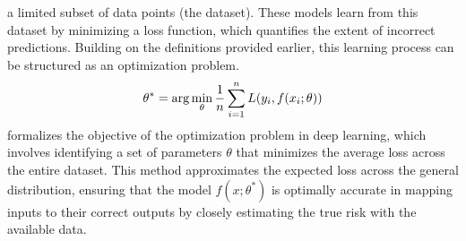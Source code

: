 a limited subset of data points (the dataset). These models learn from this
dataset by minimizing a loss function, which quantifies the extent of incorrect
predictions. Building on the definitions provided earlier, this learning
process can be structured as an optimization problem.
\begin{equation}
\labeq{2_2}
\theta^* = \arg \min_{\theta} \frac{1}{n} \sum_{i=1}^n L(y_i, f(x_i; \theta))
\end{equation}
 formalizes the objective of the optimization problem in deep
learning, which involves identifying a set of parameters $\theta$ that minimizes
the average loss across the entire dataset. This method approximates the
expected loss across the general distribution, ensuring that the model $f(x;
\theta^*)$ is optimally accurate in mapping inputs to their correct outputs by
closely estimating the true risk with the available data.

